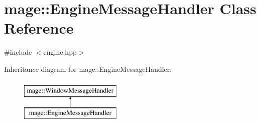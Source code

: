 \hypertarget{classmage_1_1_engine_message_handler}{}\section{mage\+:\+:Engine\+Message\+Handler Class Reference}
\label{classmage_1_1_engine_message_handler}


{\ttfamily \#include $<$engine.\+hpp$>$}

Inheritance diagram for mage\+:\+:Engine\+Message\+Handler\+:\begin{figure}[H]
\begin{center}
\leavevmode
\includegraphics[height=2.000000cm]{classmage_1_1_engine_message_handler}
\end{center}
\end{figure}
